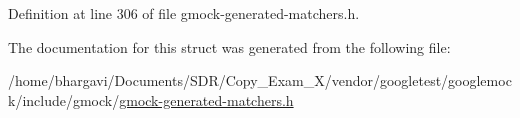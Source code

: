 Definition at line 306 of file gmock-\/generated-\/matchers.\+h.



The documentation for this struct was generated from the following file\+:\begin{DoxyCompactItemize}
\item 
/home/bhargavi/\+Documents/\+S\+D\+R/\+Copy\+\_\+\+Exam\+\_\+X/vendor/googletest/googlemock/include/gmock/\hyperlink{gmock-generated-matchers_8h}{gmock-\/generated-\/matchers.\+h}\end{DoxyCompactItemize}
